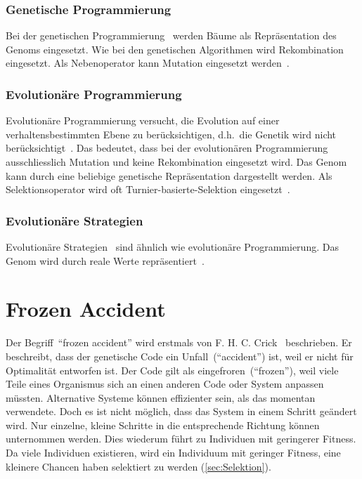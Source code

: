       \subsubsection{Genetische Programmierung\label{item:genProg}}

        Bei der genetischen Programmierung~\cite{book:genProg} werden Bäume als Repräsentation des Genoms eingesetzt.
        Wie bei den genetischen Algorithmen wird Rekombination eingesetzt.
        Als Nebenoperator kann Mutation eingesetzt werden~\cite[S.147]{book:evAlgo}.

      \subsubsection{Evolutionäre Programmierung\label{item:evProg}}

        Evolutionäre Programmierung versucht, die Evolution auf einer verhaltensbestimmten Ebene zu berücksichtigen,
        d.h.\ die Genetik wird nicht berücksichtigt~\cite[S.140]{book:evAlgo}.
        Das bedeutet, dass bei der evolutionären Programmierung~\cite{book:artIntSimEv}
        ausschliesslich Mutation und keine Rekombination eingesetzt wird.
        Das Genom kann durch eine beliebige genetische Repräsentation dargestellt werden.
        Als Selektionsoperator wird oft Turnier-basierte-Selektion eingesetzt~\cite[S.33]{book:bioInspired}.

      \subsubsection{Evolutionäre Strategien\label{item:evStrat}}

        Evolutionäre Strategien~\cite{book:evStrat} sind ähnlich wie evolutionäre Programmierung.
        Das Genom wird durch reale Werte repräsentiert~\cite[S.134]{book:evAlgo}.

  \section{Frozen Accident}

    Der Begriff~``frozen accident'' wird erstmals von F. H. C. Crick~\cite{Crick1968} beschrieben.
    Er beschreibt, dass der genetische Code ein Unfall~(``accident'') ist,
    weil er nicht für Optimalität entworfen ist.
    Der Code gilt als eingefroren~(``frozen''),
    weil viele Teile eines Organismus sich an einen anderen Code oder System anpassen müssten.
    Alternative Systeme können effizienter sein, als das momentan verwendete.
    Doch es ist nicht möglich, dass das System in einem Schritt geändert wird.
    Nur einzelne, kleine Schritte in die entsprechende Richtung können unternommen werden.
    Dies wiederum führt zu Individuen mit geringerer Fitness.
    Da viele Individuen existieren, wird ein Individuum mit geringer Fitness, eine kleinere Chancen haben selektiert zu werden (\vref{sec:Selektion}).
